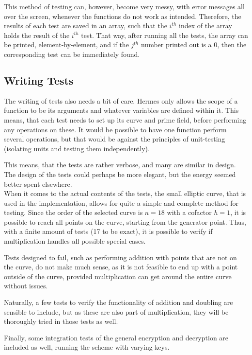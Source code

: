 This method of testing can, however, become very messy, with error messages all over the screen, whenever the functions do not work as intended. Therefore, the results of each test are saved in an array, such that the $i^{th}$ index of the array holds the result of the $i^{th}$ test. That way, after running all the tests, the array can be printed, element-by-element, and if the $j^{th}$ number printed out is a $0$, then the corresponding test can be immediately found.

\subsection{Writing Tests}
The writing of tests also needs a bit of care. Hermes only allows the scope of a function to be its arguments and whatever variables are defined within it. This means, that each test needs to set up its curve and prime field, before performing any operations on these. It would be possible to have one function perform several operations, but that would be against the principles of unit-testing (isolating units and testing them independently).

This means, that the tests are rather verbose, and many are similar in design. The design of the tests could perhaps be more elegant, but the energy seemed better spent elsewhere.
\\

When it comes to the actual contents of the tests, the small elliptic curve, that is used in the implementation, allows for quite a simple and complete method for testing. Since the order of the selected curve is $n=18$ with a cofactor $h=1$\cite{ECmod17}, it is possible to reach all points on the curve, starting from the generator point. Thus, with a finite amount of tests (17 to be exact), it is possible to verify if multiplication handles all possible special cases. 

Tests designed to fail, such as performing addition with points that are not on the curve, do not make much sense, as it is not feasible to end up with a point outside of the curve, provided multiplication can get around the entire curve without issues.

Naturally, a few tests to verify the functionality of addition and doubling are sensible to include, but as these are also part of multiplication, they will be thoroughly tried in those tests as well.

Finally, some integration tests of the general encryption and decryption are included as well, running the scheme with varying keys.   
